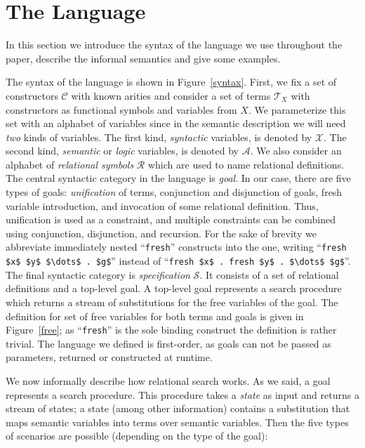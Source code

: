 \section{The Language}
\label{language}
 
In this section we introduce the syntax of the language we use throughout the paper, describe the informal semantics and give some examples.

The syntax of the language is shown in Figure~\ref{syntax}. First, we fix a set of constructors $\mathcal{C}$ with known arities and consider
a set of terms $\mathcal{T}_X$ with constructors as functional symbols and variables from $X$. We parameterize this set with an alphabet of
variables since in the semantic description we will need \emph{two} kinds of variables. The first kind, \emph{syntactic} variables, is denoted
by $\mathcal{X}$. The second kind, \emph{semantic} or \emph{logic} variables, is denoted by $\mathcal{A}$.
We also consider an alphabet of \emph{relational symbols} $\mathcal{R}$ which are used to name relational definitions.
The central syntactic category in the language is \emph{goal}. In our case, there are five types of goals: \emph{unification} of terms,
conjunction and disjunction of goals, fresh variable introduction, and invocation of some relational definition. Thus, unification is used
as a constraint, and multiple constraints can be combined using conjunction, disjunction, and recursion. For the sake of brevity we
abbreviate immediately nested ``\lstinline|fresh|'' constructs into the one, writing ``\lstinline|fresh $x$ $y$ $\dots$ . $g$|'' instead of
``\lstinline|fresh $x$ . fresh $y$ . $\dots$ $g$|''. The final syntactic category is \emph{specification} $\mathcal{S}$. It consists of a set
of relational definitions and a top-level goal. A top-level goal represents a search procedure which returns a stream of substitutions for
the free variables of the goal. The definition for set of free variables for both terms and goals is given in Figure~\ref{free}; as ``\lstinline|fresh|''
is the sole binding construct the definition is rather trivial. The language we defined is first-order, as goals can not be passed as parameters,
returned or constructed at runtime.

We now informally describe how relational search works. As we said, a goal represents a search procedure. This procedure takes a \emph{state} as input and returns a
stream of states; a state (among other information) contains a substitution that maps semantic variables into terms over semantic variables. Then the five types of
scenarios are possible (depending on the type of the goal):

